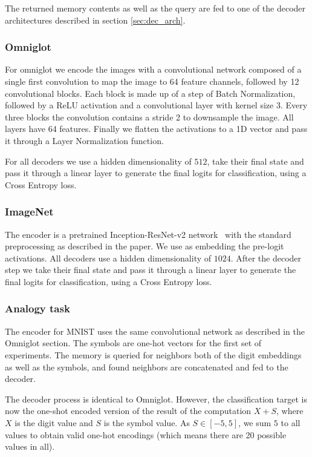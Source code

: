 \documentclass{article} \usepackage{iclr2019_conference,times}
\begin{document}
The returned memory contents as well as the query are fed to one of the decoder architectures described in section \ref{sec:dec_arch}.

\subsubsection{Omniglot}

For omniglot we encode the images with a convolutional network composed of a single first convolution to map the image to 64 feature channels, followed by 12 convolutional blocks. Each block is made up of a step of Batch Normalization, followed by a ReLU activation and a convolutional layer with kernel size 3. Every three blocks the convolution contains a stride 2 to downsample the image. All layers have 64 features. Finally we flatten the activations to a 1D vector and pass it through a Layer Normalization function.

For all decoders we use a hidden dimensionality of $512$, take their final state and pass it through a linear layer to generate the final logits for classification, using a Cross Entropy loss.

\subsubsection{ImageNet}

The encoder is a pretrained Inception-ResNet-v2 network~\citep{szegedy2017inception} with the standard preprocessing as described in the paper. We use as embedding the pre-logit activations. All decoders use a hidden dimensionality of $1024$. After the decoder step we take their final state and pass it through a linear layer to generate the final logits for classification, using a Cross Entropy loss.

\subsubsection{Analogy task}

The encoder for MNIST uses the same convolutional network as described in the Omniglot section. The symbols are one-hot vectors for the first set of experiments. The memory is queried for neighbors both of the digit embeddings as well as the symbols, and found neighbors are concatenated and fed to the decoder.

The decoder process is identical to Omniglot. However, the classification target is now the one-shot encoded version of the result of the computation $X + S$, where $X$ is the digit value and $S$ is the symbol value. As $S \in [-5, 5]$, we sum $5$ to all values to obtain valid one-hot encodings (which means there are 20 possible values in all).
\end{document}
